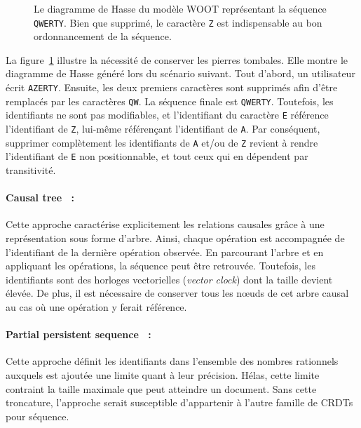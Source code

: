 \begin{figure}
  \centering
  
  \caption[Diagramme de Hasse dans WOOT]
  {\label{repl:fig:wootexample}Le diagramme de Hasse du modèle WOOT représentant
    la séquence \texttt{QWERTY}. Bien que supprimé, le caractère \texttt{Z} est
    indispensable au bon ordonnancement de la séquence.}
\end{figure}

\noindent La figure~\ref{repl:fig:wootexample} illustre la nécessité de
conserver les pierres tombales. Elle montre le diagramme de Hasse généré lors du
scénario suivant. Tout d'abord, un utilisateur écrit \texttt{AZERTY}. Ensuite,
les deux premiers caractères sont supprimés afin d'être remplacés par les
caractères \texttt{QW}. La séquence finale est \texttt{QWERTY}. Toutefois, les
identifiants ne sont pas modifiables, et l'identifiant du caractère \texttt{E}
référence l'identifiant de \texttt{Z}, lui-même référençant l'identifiant de
\texttt{A}. Par conséquent, supprimer complètement les identifiants de
\texttt{A} et/ou de \texttt{Z} revient à rendre l'identifiant de \texttt{E} non
positionnable, et tout ceux qui en dépendent par transitivité.

\paragraph{Causal tree~\cite{grishchenko2010deep} :} Cette approche caractérise
explicitement les relations causales grâce à une représentation sous forme
d'arbre. Ainsi, chaque opération est accompagnée de l'identifiant de la dernière
opération observée. En parcourant l'arbre et en appliquant les opérations, la
séquence peut être retrouvée. Toutefois, les identifiants sont des horloges
vectorielles (\emph{vector clock}) dont la taille devient élevée. De plus, il
est nécessaire de conserver tous les nœuds de cet arbre causal au cas où une
opération y ferait référence.

\paragraph{Partial persistent sequence~\cite{wu2010partial} :} Cette approche
définit les identifiants dans l'ensemble des nombres rationnels auxquels est
ajoutée une limite quant à leur précision. Hélas, cette limite contraint la
taille maximale que peut atteindre un document. Sans cette troncature,
l'approche serait susceptible d'appartenir à l'autre famille de CRDTs pour
séquence.

